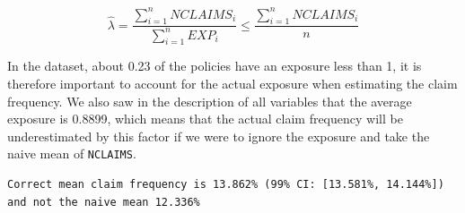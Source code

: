 \documentclass[
  english,
  11pt,
]{article}
\newenvironment{Shaded}{\begin{snugshade}}{\end{snugshade}}
\newcommand{\DecValTok}[1]{\textcolor[rgb]{0.00,0.00,0.81}{#1}}
\newcommand{\FloatTok}[1]{\textcolor[rgb]{0.00,0.00,0.81}{#1}}
\newcommand{\FunctionTok}[1]{\textcolor[rgb]{0.13,0.29,0.53}{\textbf{#1}}}
\newcommand{\NormalTok}[1]{#1}
\newcommand{\OtherTok}[1]{\textcolor[rgb]{0.56,0.35,0.01}{#1}}
\newcommand{\SpecialCharTok}[1]{\textcolor[rgb]{0.81,0.36,0.00}{\textbf{#1}}}
\newcommand{\StringTok}[1]{\textcolor[rgb]{0.31,0.60,0.02}{#1}}
\begin{document}
\[\hat{\lambda} = \frac{\sum_{i=1}^{n} NCLAIMS_i}{\sum_{i=1}^{n} EXP_i} \leq \frac{\sum_{i=1}^{n} NCLAIMS_i}{n}\]

In the dataset, about 0.23 of the policies have an exposure less than 1,
it is therefore important to account for the actual exposure when
estimating the claim frequency. We also saw in the description of all
variables that the average exposure is 0.8899, which means that the
actual claim frequency will be underestimated by this factor if we were
to ignore the exposure and take the naive mean of \texttt{NCLAIMS}.

\begin{Shaded}
\end{Shaded}

\begin{verbatim}
Correct mean claim frequency is 13.862% (99% CI: [13.581%, 14.144%]) and not the naive mean 12.336%
\end{verbatim}
\end{document}
